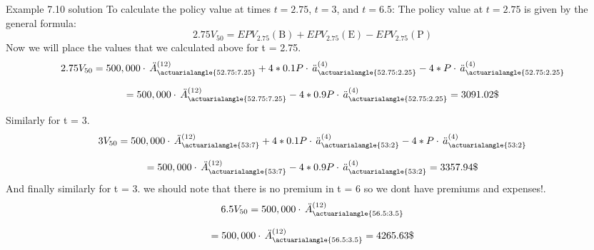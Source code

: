 \begin{solve}{}{Example 7.10 solution}
		To calculate the policy value at times \(t = 2.75\), \(t = 3\), and \(t = 6.5\):
		The policy value at  \(t = 2.75 \) is given by the general formula:
		\[
		2.75V_{50} = EPV_{2.75}(\text{B}) + EPV_{2.75}(\text{E}) -  EPV_{2.75}(\text{P})
		\]
		Now we will place the values that we calculated above for t = 2.75.
		\[
		2.75V_{50} = 500,000 \cdot \,  \ddot{A}_{\actuarialangle{52.75:7.25}}^{(12)} + 4 * 0.1P \cdot \, \ddot{a}_{\actuarialangle{52.75:2.25}}^{(4)} - 4 * P \cdot \, \ddot{a}_{\actuarialangle{52.75:2.25}}^{(4)}
		\]
		
		$$= 
		500,000 \cdot \,  \ddot{A}_{\actuarialangle{52.75:7.25}}^{(12)} - 4 * 0.9P \cdot \, \ddot{a}_{\actuarialangle{52.75:2.25}}^{(4)} = 3091.02\$ $$
		
	
		Similarly for t = 3.
		\[
		3V_{50} = 500,000 \cdot \,  \ddot{A}_{\actuarialangle{53:7}}^{(12)} + 4 * 0.1P \cdot \, \ddot{a}_{\actuarialangle{53:2}}^{(4)} - 4 * P \cdot \, \ddot{a}_{\actuarialangle{53:2}}^{(4)}
		\]
		
		$$= 
		500,000 \cdot \,  \ddot{A}_{\actuarialangle{53:7}}^{(12)} - 4 * 0.9P \cdot \, \ddot{a}_{\actuarialangle{53:2}}^{(4)} = 3357.94\$ $$
		And finally similarly for t = 3.
		we should note that there is no premium in t = 6 so we dont have premiums and expenses!.
		\[
		6.5V_{50} = 500,000 \cdot \,  \ddot{A}_{\actuarialangle{56.5:3.5}}^{(12)} 
		\]
		
		$$= 
		500,000 \cdot \,  \ddot{A}_{\actuarialangle{56.5:3.5}}^{(12)} = 4265.63\$ $$
		
	
		
	\end{solve}
